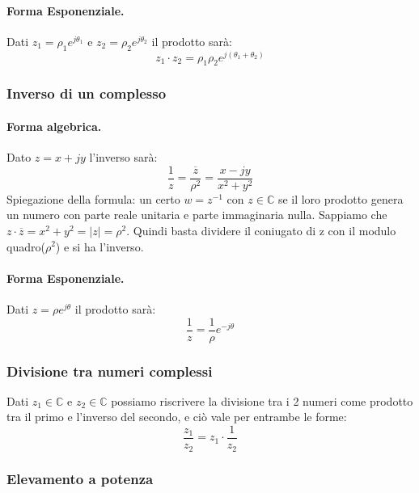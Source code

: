 \paragraph{Forma Esponenziale.} Dati $z_1 = \rho_1 e^{j\theta_1}$ e $z_2 = \rho_2 e^{j\theta_2}$ il prodotto sarà:
\begin{equation}
    z_1 \cdot z_2 = \rho_1 \rho_2 e^{j(\theta_1 + \theta_2)}
\end{equation}

\subsubsection{Inverso di un complesso}
\paragraph{Forma algebrica.} Dato $z = x + jy$ l'inverso sarà:
\begin{equation}
    \frac{1}{z} = \frac{\overline{z}}{\rho^2} = \frac{x - jy}{x^2 + y^2}
\end{equation}
Spiegazione della formula: un certo $w = z^{-1}$ con $z \in \mathbb{C}$ se il loro prodotto genera un numero con parte reale unitaria e parte immaginaria nulla.
Sappiamo che $z\cdot \overline{z} = x^2 + y^2 = \left\lvert z\right\rvert = \rho^2$. Quindi basta dividere il coniugato di z con il modulo quadro($\rho^2$) e si ha l'inverso.
\paragraph{Forma Esponenziale.} Dati $z = \rho e^{j\theta}$ il prodotto sarà:
\begin{equation}
    \frac{1}{z} = \frac{1}{\rho} e^{-j\theta}
\end{equation}

\subsubsection{Divisione tra numeri complessi}
Dati $z_1 \in \mathbb{C}$ e $z_2 \in \mathbb{C}$ possiamo riscrivere la divisione tra i 2 numeri come prodotto tra il primo e l'inverso del secondo, e ciò vale per entrambe le forme:
\begin{equation}
    \frac{z_1}{z_2} = z_1 \cdot \frac{1}{z_2}
\end{equation}


\subsubsection{Elevamento a potenza}
